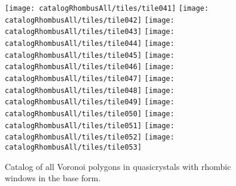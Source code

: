 \documentclass[text.tex]{subfiles}
\begin{document}
\begin{figure}[h!]
\begin{flushleft}
\texttt{[image: catalogRhombusAll/tiles/tile041]}%
\texttt{[image: catalogRhombusAll/tiles/tile042]}
\texttt{[image: catalogRhombusAll/tiles/tile043]}%
\texttt{[image: catalogRhombusAll/tiles/tile044]}%
\texttt{[image: catalogRhombusAll/tiles/tile045]}%
\texttt{[image: catalogRhombusAll/tiles/tile046]}%
\texttt{[image: catalogRhombusAll/tiles/tile047]}%
\texttt{[image: catalogRhombusAll/tiles/tile048]}
\texttt{[image: catalogRhombusAll/tiles/tile049]}%
\texttt{[image: catalogRhombusAll/tiles/tile050]}%
\texttt{[image: catalogRhombusAll/tiles/tile051]}%
\texttt{[image: catalogRhombusAll/tiles/tile052]}%
\texttt{[image: catalogRhombusAll/tiles/tile053]}%
\end{flushleft}
\caption{Catalog of all Voronoi polygons in quasicrystals with rhombic windows in the base form.}
\label{fig:catalogRhombicTiles}
\end{figure}
\end{document}
